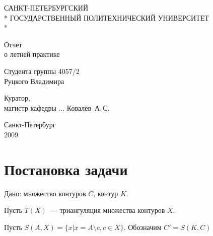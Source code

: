 \documentclass[a4paper,12pt,titlepage]{report}
\begin{document}
\begin{titlepage}
\newpage

\begin{center}
САНКТ-ПЕТЕРБУРГСКИЙ \\*
ГОСУДАРСТВЕННЫЙ ПОЛИТЕХНИЧЕСКИЙ УНИВЕРСИТЕТ \\*
\hrulefill
\end{center}


\vspace{1cm}
\vspace{8em}

\begin{center}
\Large{Отчет \\ о летней практике}
\end{center}

\vspace{2.5em}

\begin{center}
Студента группы 4057/2 \\ Руцкого Владимира
\end{center}

\vspace{14em}

\begin{flushleft}
Куратор, \\
магистр кафедры ...  \hfill Ковалёв~А.\,С.
\end{flushleft}

\vspace{\fill}

\begin{center}
Санкт-Петербург \\ 2009
\end{center}

\end{titlepage}
\pagebreak


\section*{Постановка задачи}
Дано: множество контуров $C$, контур $K$.

Пусть $T(X)$~--- триангуляция множества контуров $X$.

Пусть $S(A, X) = \{ x | x = A \setminus c, c \in X \}$. Обозначим $C' = S(K, C)$
\end{document}
